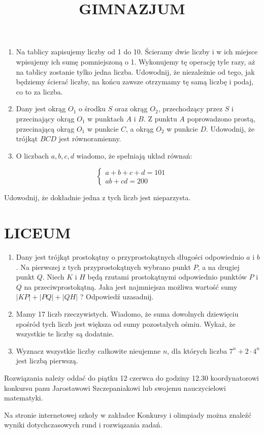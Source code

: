 \documentclass[10pt]{article}
\title{GIMNAZJUM }
\author{}
\date{}
\begin{document}
\maketitle
\begin{enumerate}
  \item Na tablicy zapisujemy liczby od 1 do 10. Ścieramy dwie liczby i w ich miejsce wpisujemy ich sumę pomniejszoną o 1. Wykonujemy tę operację tyle razy, aż na tablicy zostanie tylko jedna liczba. Udowodnij, że niezależnie od tego, jak będziemy ścierać liczby, na końcu zawsze otrzymamy tę samą liczbę i podaj, co to za liczba.
  \item Dany jest okrąg \(O_{1}\) o środku \(S\) oraz okrąg \(O_{2}\), przechodzący przez \(S\) i przecinający okrąg \(O_{1}\) w punktach \(A\) i \(B\). Z punktu \(A\) poprowadzono prostą, przecinającą okrąg \(O_{1}\) w punkcie \(C\), a okrąg \(O_{2}\) w punkcie \(D\). Udowodnij, że trójkąt \(B C D\) jest równoramienny.
  \item O liczbach \(a, b, c, d\) wiadomo, że spełniają układ równań:
\end{enumerate}

\[
\left\{\begin{array}{c}
a+b+c+d=101 \\
a b+c d=200
\end{array}\right.
\]

Udowodnij, że dokładnie jedna z tych liczb jest nieparzysta.

\section*{LICEUM}
\begin{enumerate}
  \item Dany jest trójkąt prostokątny o przyprostokątnych długości odpowiednio \(a\) i \(b\). Na pierwszej z tych przyprostokątnych wybrano punkt \(P\), a na drugiej punkt \(Q\). Niech \(K\) i \(H\) będą rzutami prostokątnymi odpowiednio punktów \(P\) i \(Q\) na przeciwprostokątną. Jaka jest najmniejsza możliwa wartość sumy \(|K P|+|P Q|+|Q H|\) ? Odpowiedź uzasadnij.
  \item Mamy 17 liczb rzeczywistych. Wiadomo, że suma dowolnych dziewięciu spośród tych liczb jest większa od sumy pozostałych ośmiu. Wykaż, że wszystkie te liczby są dodatnie.
  \item Wyznacz wszystkie liczby całkowite nieujemne \(n\), dla których liczba \(7^{n}+2 \cdot 4^{n}\) jest liczbą pierwszą.
\end{enumerate}

Rozwiązania należy oddać do piątku 12 czerwca do godziny 12.30 koordynatorowi konkursu panu Jarostawowi Szczepaniakowi lub swojemu nauczycielowi matematyki.

Na stronie internetowej szkoły w zakładce Konkursy i olimpiady można znaleźć wyniki dotychczasowych rund i rozwiązania zadań.
\end{document}
